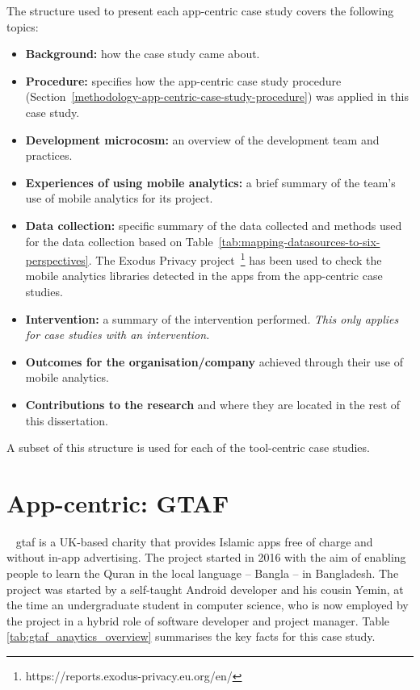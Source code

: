 The structure used to present each app-centric case study covers the following topics:
\begin{itemize}
    \itemsep0em
    \item \textbf{Background:} how the case study came about.
    \item \textbf{Procedure:} specifies how the app-centric case study procedure (Section~\ref{methodology-app-centric-case-study-procedure}) was applied in this case study.
    \item \textbf{Development microcosm:} an overview of the development team and practices.
    \item \textbf{Experiences of using mobile analytics:} a brief summary of the team's use of mobile analytics for its project.
    \item \textbf{Data collection:} specific summary of the data collected and methods used for the data collection based on Table~\ref{tab:mapping-datasources-to-six-perspectives}. The Exodus Privacy project~\footnote{https://reports.exodus-privacy.eu.org/en/} has been used to check the mobile analytics libraries detected in the apps from the app-centric case studies. 
    \item \textbf{Intervention:} a summary of the intervention performed. \textit{This only applies for case studies with an intervention.}
    \item \textbf{Outcomes for the organisation/company} achieved through their use of mobile analytics.
    \item \textbf{Contributions to the research} and where they are located in the rest of this dissertation.
\end{itemize}
A subset of this structure is used for each of the tool-centric case studies. 
\clearpage





\section{App-centric: GTAF}~\label{case-study-overview-gtaf}
\Acrfull{gtaf} is a UK-based charity that provides Islamic apps free of charge and without in-app advertising. The project started in 2016 with the aim of enabling people to learn the Quran in the local language -- Bangla -- in Bangladesh. The project was started by a self-taught Android developer and his cousin Yemin, at the time an undergraduate student in computer science, who is now employed by the project in a hybrid role of software developer and project manager. Table \ref{tab:gtaf_anaytics_overview} summarises the key facts for this case study.

